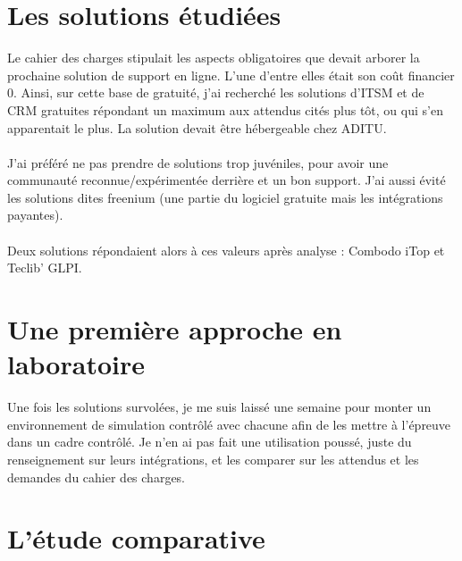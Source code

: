 \section{Les solutions étudiées}

Le cahier des charges stipulait les aspects obligatoires que devait arborer la prochaine solution de support en ligne. L'une d'entre elles était son coût financier 0. Ainsi, sur cette base de gratuité, j'ai recherché les solutions d'ITSM et de CRM gratuites répondant un maximum aux attendus cités plus tôt, ou qui s'en apparentait le plus. La solution devait être hébergeable chez ADITU.
\\ \\
J'ai préféré ne pas prendre de solutions trop juvéniles, pour avoir une communauté reconnue/expérimentée derrière et un bon support. J'ai aussi évité les solutions dites freenium (une partie du logiciel gratuite mais les intégrations payantes).
\\ \\
Deux solutions répondaient alors à ces valeurs après analyse : Combodo iTop et Teclib' GLPI.

\section{Une première approche en laboratoire}

Une fois les solutions survolées, je me suis laissé une semaine pour monter un environnement de simulation contrôlé avec chacune afin de les mettre à l'épreuve dans un cadre contrôlé. Je n'en ai pas fait une utilisation poussé, juste du renseignement sur leurs intégrations, et les comparer sur les attendus et les demandes du cahier des charges. 

\section{L'étude comparative}

